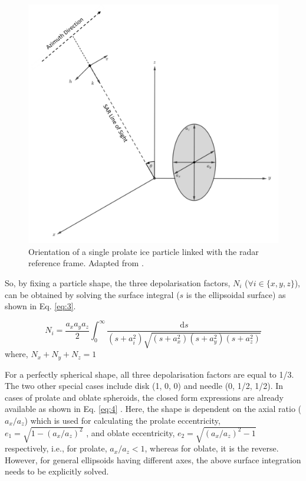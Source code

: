 \documentclass[review]{elsarticle}
\numberwithin{equation}{section}
\numberwithin{figure}{section}
\numberwithin{table}{section}
\begin{document}
\begin{figure}[htb]
    \centering
    \includegraphics[width=\textwidth]{Figures/Prolate_New.png}
    \caption{Orientation of a single prolate ice particle linked with the radar reference frame. Adapted from \cite{Leinss2014}.}
    \label{fig:prolate}
\end{figure}

So, by fixing a particle shape, the three depolarisation factors, $N_i$ ($\forall i \in \{x, y, z\}$), can be obtained by
solving the surface integral ($s$ is the ellipsoidal surface) as shown in Eq. \eqref{eq:3}.

\begin{equation}
    \label{eq:3}
	N_i =\frac{a_xa_ya_z}{2}\int_0^\infty\frac{\mathrm{d}s}{(s+a_i^2)\sqrt{(s+a_x^2)(s+a_y^2)(s+a_z^2)}}
\end{equation}
where, $N_x + N_y + N_z = 1$

For a perfectly spherical shape, all three depolarisation factors are equal to 1/3. The two other special
cases include disk (1, 0, 0) and needle (0, 1/2, 1/2). In cases of prolate and oblate spheroids, the closed
form expressions are already available as shown in Eq. \eqref{eq:4} \citep{Sihvola1999}. Here, the shape is dependent
on the axial ratio ($a_x/a_z$) which is used for calculating the prolate eccentricity, $e_1 = \sqrt{1 - (a_x/a_z)^2}$ , and
oblate eccentricity, $e_2 = \sqrt{(a_x/a_z)^2 - 1}$ respectively, i.e., for prolate, $a_x/a_z < 1$, whereas for oblate, it
is the reverse. However, for general ellipsoids having different axes, the above surface integration needs to
be explicitly solved.
\end{document}
